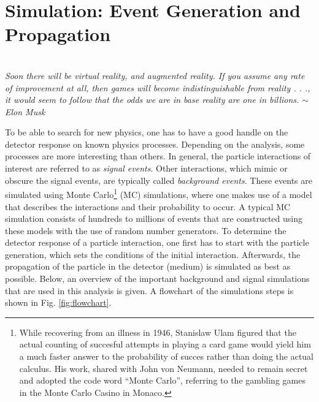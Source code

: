 \chapter{Simulation: Event Generation and Propagation}
\label{ch:simulation}
\begin{flushright}
\textit{\\Soon there will be virtual reality, and augmented reality. If you assume any rate of improvement at all, then games will become indistinguishable from reality . . ., it would seem to follow that the odds we are in base reality are one in billions. $\sim$ Elon Musk\\}
\end{flushright}
To be able to search for new physics, one has to have a good handle on the detector response on known physics processes. Depending on the analysis, some processes are more interesting than others. In general, the particle interactions of interest are referred to as \textit{signal events}. Other interactions, which mimic or obscure the signal events, are typically called \textit{background events}. These events are simulated using Monte Carlo\footnote{While recovering from an illness in 1946, Stanislaw Ulam figured that the actual counting of succesful attempts in playing a card game would yield him a much faster answer to the probability of succes rather than doing the actual calculus. His work, shared with John von Neumann, needed to remain secret and adopted the code word ``Monte Carlo'', referring to the gambling games in the Monte Carlo Casino in Monaco.} (MC) simulations, where one makes use of a model that describes the interactions and their probability to occur. A typical MC simulation consists of hundreds to millions of events that are constructed using these models with the use of random number generators. To determine the detector response of a particle interaction, one first has to start with the particle generation, which sets the conditions of the initial interaction. Afterwards, the propagation of the particle in the detector (medium) is simulated as best as possible. Below, an overview of the important background and signal simulations that are used in this analysis is given. A flowchart of the simulations steps is shown in Fig. \ref{fig:flowchart}.

